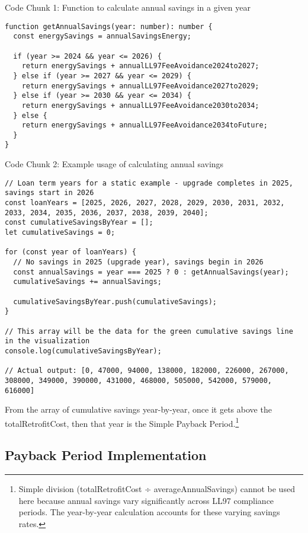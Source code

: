 \documentclass{article}
\begin{document}
\bigskip

Code Chunk 1: Function to calculate annual savings in a given year
\begin{lstlisting}
function getAnnualSavings(year: number): number {
  const energySavings = annualSavingsEnergy;
  
  if (year >= 2024 && year <= 2026) {
    return energySavings + annualLL97FeeAvoidance2024to2027;
  } else if (year >= 2027 && year <= 2029) {
    return energySavings + annualLL97FeeAvoidance2027to2029;
  } else if (year >= 2030 && year <= 2034) {
    return energySavings + annualLL97FeeAvoidance2030to2034;
  } else {
    return energySavings + annualLL97FeeAvoidance2034toFuture;
  }
}
\end{lstlisting}

Code Chunk 2: Example usage of calculating annual savings
\begin{lstlisting}
// Loan term years for a static example - upgrade completes in 2025, savings start in 2026
const loanYears = [2025, 2026, 2027, 2028, 2029, 2030, 2031, 2032, 2033, 2034, 2035, 2036, 2037, 2038, 2039, 2040];
const cumulativeSavingsByYear = [];
let cumulativeSavings = 0;

for (const year of loanYears) {
  // No savings in 2025 (upgrade year), savings begin in 2026
  const annualSavings = year === 2025 ? 0 : getAnnualSavings(year);
  cumulativeSavings += annualSavings;
  
  cumulativeSavingsByYear.push(cumulativeSavings);
}

// This array will be the data for the green cumulative savings line in the visualization
console.log(cumulativeSavingsByYear);

// Actual output: [0, 47000, 94000, 138000, 182000, 226000, 267000, 308000, 349000, 390000, 431000, 468000, 505000, 542000, 579000, 616000]
\end{lstlisting}

From the array of cumulative savings year-by-year, once it gets above the totalRetrofitCost, then that year is the Simple Payback Period.\footnote{Simple division (totalRetrofitCost ÷ averageAnnualSavings) cannot be used here because annual savings vary significantly across LL97 compliance periods. The year-by-year calculation accounts for these varying savings rates.}

\subsection{Payback Period Implementation}
\end{document}
